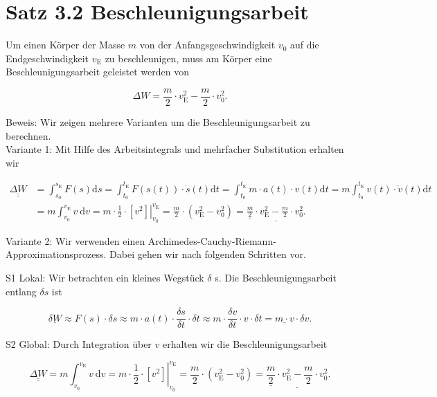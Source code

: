 \documentclass[10pt]{article}
\begin{document}
\section*{Satz 3.2 Beschleunigungsarbeit}
Um einen Körper der Masse $m$ von der Anfangsgeschwindigkeit $v_{0}$ auf die Endgeschwindigkeit $v_{\mathrm{E}}$ zu beschleunigen, muss am Körper eine Beschleunigungsarbeit geleistet werden von


\begin{equation*}
\Delta W=\frac{m}{2} \cdot v_{\mathrm{E}}^{2}-\frac{m}{2} \cdot v_{0}^{2} . \tag{3.18}
\end{equation*}


Beweis: Wir zeigen mehrere Varianten um die Beschleunigungsarbeit zu berechnen.\\
Variante 1: Mit Hilfe des Arbeitsintegrals und mehrfacher Substitution erhalten wir


\begin{align*}
\underline{\underline{\Delta W}} & =\int_{s_{0}}^{s_{\mathrm{E}}} F(s) \mathrm{d} s=\int_{t_{0}}^{t_{\mathrm{E}}} F(s(t)) \cdot \dot{s}(t) \mathrm{d} t=\int_{t_{0}}^{t_{\mathrm{E}}} m \cdot a(t) \cdot v(t) \mathrm{d} t=m \int_{t_{0}}^{t_{\mathrm{E}}} v(t) \cdot \dot{v}(t) \mathrm{d} t \\
& =m \int_{v_{0}}^{v_{\mathrm{E}}} v \mathrm{~d} v=\left.m \cdot \frac{1}{2} \cdot\left[v^{2}\right]\right|_{v_{0}} ^{v_{\mathrm{E}}}=\frac{m}{2} \cdot\left(v_{\mathrm{E}}^{2}-v_{0}^{2}\right)=\underline{\underline{\frac{m}{2}} \cdot v_{\mathrm{E}}^{2}-\frac{m}{2} \cdot v_{0}^{2} .} \tag{3.19}
\end{align*}


Variante 2: Wir verwenden einen Archimedes-Cauchy-Riemann-Approximationsprozess. Dabei gehen wir nach folgenden Schritten vor.

S1 Lokal: Wir betrachten ein kleines Wegstück $\delta$ s. Die Beschleunigungsarbeit entlang $\delta s$ ist


\begin{equation*}
\underline{\delta W} \approx F(s) \cdot \delta s \approx m \cdot a(t) \cdot \frac{\delta s}{\delta t} \cdot \delta t \approx m \cdot \frac{\delta v}{\delta t} \cdot v \cdot \delta t=\underline{m \cdot v} \cdot \delta v . \tag{3.20}
\end{equation*}


S2 Global: Durch Integration über $v$ erhalten wir die Beschleunigungsarbeit


\begin{equation*}
\underline{\underline{\Delta W}}=m \int_{v_{0}}^{v_{\mathrm{E}}} v \mathrm{~d} v=\left.m \cdot \frac{1}{2} \cdot\left[v^{2}\right]\right|_{v_{0}} ^{v_{\mathrm{E}}}=\frac{m}{2} \cdot\left(v_{\mathrm{E}}^{2}-v_{0}^{2}\right)=\underline{\underline{\frac{m}{2}} \cdot v_{\mathrm{E}}^{2}-\frac{m}{2} \cdot v_{0}^{2}} . \tag{3.21}
\end{equation*}
\end{document}
